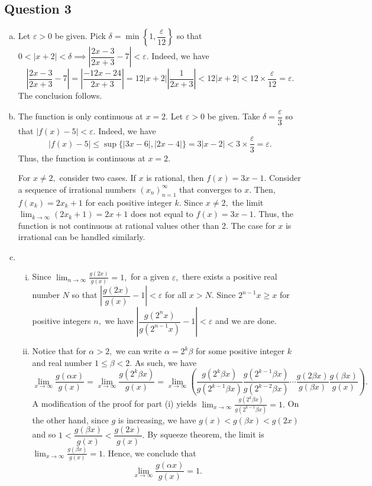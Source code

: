 \documentclass{article}
\begin{document}
\subsection*{Question 3}
\begin{enumerate}[(a)]
    \item Let $\varepsilon>0$ be given. Pick $\delta=\min\left\{1,\dfrac{\varepsilon}{12}\right\}$ so that $0<|x+2|<\delta\implies \left|\dfrac{2x-3}{2x+3}-7\right|<\varepsilon.$ Indeed, we have $$\left|\frac{2x-3}{2x+3}-7\right|=\left|\frac{-12x-24}{2x+3}\right|=12|x+2|\left|\frac{1}{2x+3}\right|<12|x+2|<12\times\frac{\varepsilon}{12}=\varepsilon.$$ The conclusion follows.
    \item The function is only continuous at $x=2.$ Let $\varepsilon>0$ be given. Take $\delta=\dfrac{\varepsilon}{3}$ so that $|f(x)-5|<\varepsilon.$ Indeed, we have $$ |f(x)-5|\leq \sup\{|3x-6|,|2x-4|\}=3|x-2|<3\times\frac{\varepsilon}{3}=\varepsilon.$$ Thus, the function is continuous at $x=2.$
    
    For $x\neq2,$ consider two cases. If $x$ is rational, then $f(x)=3x-1.$ Consider a sequence of irrational numbers $(x_n)^{\infty}_{n=1}$ that converges to $x.$ Then, $f(x_k)=2x_k+1$ for each positive integer $k.$ Since $x\neq 2,$ the limit $\displaystyle\lim_{k\to\infty}(2x_k+1)=2x+1$ does not equal to $f(x)=3x-1.$ Thus, the function is not continuous at rational values other than 2. The case for $x$ is irrational can be handled similarly.
    \item \begin{enumerate}[(i)]
        \item Since $\displaystyle\lim_{n\to\infty}\frac{g(2x)}{g(x)}=1,$ for a given $\varepsilon,$ there exists a positive real number $N$ so that $\left|\dfrac{g(2x)}{g(x)}-1\right|<\varepsilon$ for all $x>N.$ Since $2^{n-1}x\geq x$ for positive integers $n,$ we have $\left|\dfrac{g(2^nx)}{g(2^{n-1}x)}-1\right|<\varepsilon$ and we are done.
        \item Notice that for $\alpha>2,$ we can write $\alpha=2^k\beta$ for some positive integer $k$ and real number $1\leq\beta<2.$ As such, we have $$\lim_{x\to\infty}\frac{g(\alpha x)}{g(x)}=\lim_{x\to\infty}\frac{g(2^k\beta x)}{g(x)}=\lim_{x\to\infty}\left(\frac{g(2^k\beta x)}{g(2^{k-1}\beta x)}\frac{g(2^{k-1}\beta x)}{g(2^{k-2}\beta x)}\cdots \frac{g(2\beta x)}{g(\beta x)}\frac{g(\beta x)}{g(x)}\right).$$
        A modification of the proof for part (i) yields $\displaystyle\lim_{x\to\infty}\frac{g(2^k\beta x)}{g(2^{k-1}\beta x)}=1.$ On the other hand, since $g$ is increasing, we have $g(x)<g(\beta x)<g(2x)$ and so $1<\dfrac{g(\beta x)}{g(x)}<\dfrac{g(2x)}{g(x)}.$ By squeeze theorem, the limit is $\displaystyle\lim_{x\to\infty}\frac{g(\beta x)}{g(x)}=1.$ Hence, we conclude that $$\lim_{x\to\infty}\frac{g(\alpha x)}{g(x)}=1.$$
    \end{enumerate}
\end{enumerate}
\end{document}
